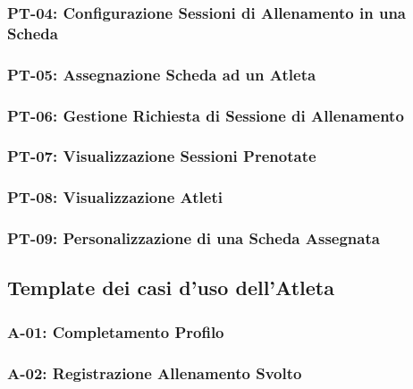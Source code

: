 \subsubsection{PT-04: Configurazione Sessioni di Allenamento in una Scheda}


\subsubsection{PT-05: Assegnazione Scheda ad un Atleta}


\subsubsection{PT-06: Gestione Richiesta di Sessione di Allenamento}


\subsubsection{PT-07: Visualizzazione Sessioni Prenotate}


\subsubsection{PT-08: Visualizzazione Atleti}


\subsubsection{PT-09: Personalizzazione di una Scheda Assegnata}


\subsection{Template dei casi d'uso dell'Atleta}
\subsubsection{A-01: Completamento Profilo}


\subsubsection{A-02: Registrazione Allenamento Svolto}


